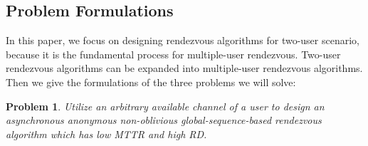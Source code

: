 \documentclass[10pt, conference, letterpaper]{IEEEtran}
\newtheorem{problem}{Problem}
\begin{document}
%
%
%

\subsection{Problem Formulations}
In this paper, we focus on designing rendezvous algorithms for two-user scenario, because it is the fundamental process for multiple-user rendezvous. Two-user rendezvous algorithms can be expanded into multiple-user rendezvous algorithms. Then we give the formulations of the three problems we will solve:
\begin{problem}
Utilize an arbitrary available channel of a user to design an asynchronous anonymous non-oblivious global-sequence-based rendezvous algorithm which has low MTTR and high RD.
\end{problem}
\end{document}
